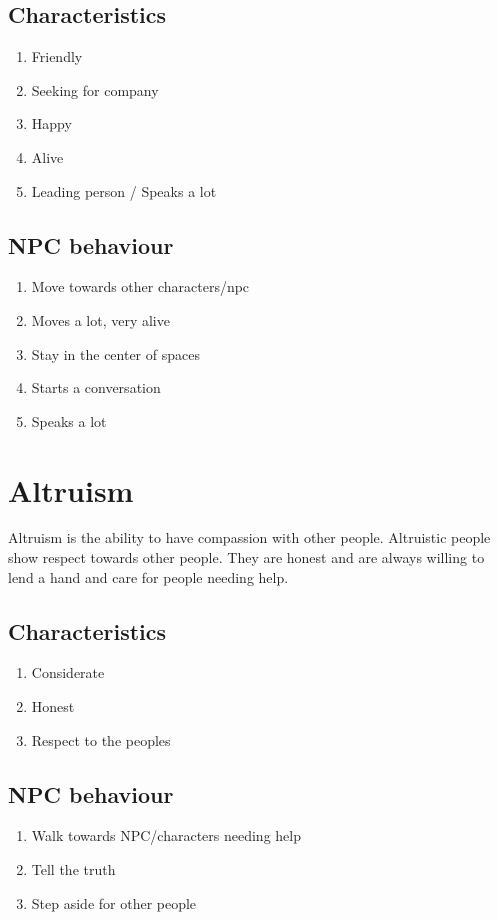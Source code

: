 \documentclass{article}
\begin{document}
\subsection{Characteristics}
\begin{enumerate}
\item Friendly 
\item Seeking for company
\item Happy
\item Alive 
\item Leading person / Speaks a lot
\end{enumerate} 

\subsection{NPC behaviour}
\begin{enumerate}
\item Move towards other characters/npc 
\item Moves a lot, very alive
\item Stay in the center of spaces
\item Starts a conversation
\item Speaks a lot
\end{enumerate} 

\section{Altruism}
Altruism is the ability to have compassion with other people. Altruistic people show
respect towards other people. They are honest and are always willing to lend a hand and care
for people needing help. \cite{altruisme} 

\subsection{Characteristics}
\begin{enumerate}
\item Considerate 
\item Honest
\item Respect to the peoples 
\end{enumerate} 

\subsection{NPC behaviour}
\begin{enumerate}
\item Walk towards NPC/characters needing help
\item Tell the truth
\item Step aside for other people
\end{enumerate} 
\end{document}
